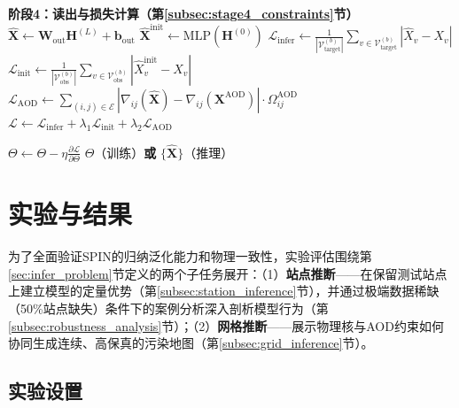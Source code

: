 \begin{algorithm}[htbp]
\begin{algorithmic}[1]
        \STATE \textbf{阶段4：读出与损失计算（第\ref{subsec:stage4_constraints}节）}
        \STATE $\hat{\mathbf{X}} \leftarrow \mathbf{W}_{\text{out}} \mathbf{H}^{(L)} + \mathbf{b}_{\text{out}}$ 
        \STATE $\hat{\mathbf{X}}^{\text{init}} \leftarrow \text{MLP}(\mathbf{H}^{(0)})$ 
        \STATE $\mathcal{L}_{\mathrm{infer}} \leftarrow \frac{1}{|\mathcal{V}_{\text{target}}^{(b)}|}\sum_{v \in \mathcal{V}_{\text{target}}^{(b)}} |\hat{X}_v - X_v|$ 
        \STATE $\mathcal{L}_{\mathrm{init}} \leftarrow \frac{1}{|\mathcal{V}_{\text{obs}}^{(b)}|}\sum_{v \in \mathcal{V}_{\text{obs}}^{(b)}} |\hat{X}_v^{\text{init}} - X_v|$ 
        \STATE $\mathcal{L}_{\mathrm{AOD}} \leftarrow \sum_{(i,j) \in \mathcal{E}} |\nabla_{ij}(\hat{\mathbf{X}}) - \nabla_{ij}(\mathbf{X}^{\text{AOD}})| \cdot \Omega_{ij}^{\text{AOD}}$ 
        \STATE $\mathcal{L} \leftarrow \mathcal{L}_{\mathrm{infer}} + \lambda_1 \mathcal{L}_{\mathrm{init}} + \lambda_2 \mathcal{L}_{\mathrm{AOD}}$ 
    \ENDFOR

    \STATE $\Theta \leftarrow \Theta - \eta \frac{\partial \mathcal{L}}{\partial \Theta}$
    \RETURN $\Theta$（训练）\textbf{或} $\{\hat{\mathbf{X}}\}$（推理）
\end{algorithmic}
\end{algorithm}


\section{实验与结果}
\label{sec:infer_experiment}

为了全面验证SPIN的归纳泛化能力和物理一致性，实验评估围绕第\ref{sec:infer_problem}节定义的两个子任务展开：（1）\textbf{站点推断}——在保留测试站点上建立模型的定量优势（第\ref{subsec:station_inference}节），并通过极端数据稀缺（50\%站点缺失）条件下的案例分析深入剖析模型行为（第\ref{subsec:robustness_analysis}节）；（2）\textbf{网格推断}——展示物理核与AOD约束如何协同生成连续、高保真的污染地图（第\ref{subsec:grid_inference}节）。


\subsection{实验设置}
\label{subsec:infer_exp_setup}

